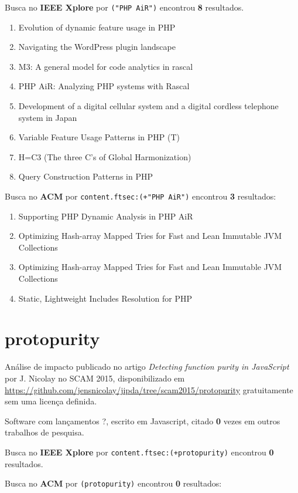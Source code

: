 Busca no {\bf IEEE Xplore} por
\texttt{("PHP AiR")}
encontrou {\bf 8}
resultados.

\begin{enumerate}
\item Evolution of dynamic feature usage in PHP
\item Navigating the WordPress plugin landscape
\item M3: A general model for code analytics in rascal
\item PHP AiR: Analyzing PHP systems with Rascal
\item Development of a digital cellular system and a digital cordless telephone system in Japan
\item Variable Feature Usage Patterns in PHP (T)
\item H=C3 (The three C's of Global Harmonization)
\item Query Construction Patterns in PHP
\end{enumerate}

Busca no {\bf ACM} por
\texttt{content.ftsec:(+"PHP AiR")}
encontrou {\bf 3}
resultados:

\begin{enumerate}
\item Supporting PHP Dynamic Analysis in PHP AiR
\item Optimizing Hash-array Mapped Tries for Fast and Lean Immutable JVM Collections
\item Optimizing Hash-array Mapped Tries for Fast and Lean Immutable JVM Collections
\item Static, Lightweight Includes Resolution for PHP
\end{enumerate}

\section{protopurity}

Análise de impacto
publicado no artigo {\it Detecting function purity in JavaScript}
por J. Nicolay
no SCAM 2015,
disponibilizado em \url{https://github.com/jensnicolay/jipda/tree/scam2015/protopurity}
gratuitamente
sem uma licença definida.

Software com lançamentos ?,
escrito em Javascript,
citado {\bf 0} vezes em outros trabalhos de pesquisa.

Busca no {\bf IEEE Xplore} por
\texttt{content.ftsec:(+protopurity)}
encontrou {\bf 0}
resultados.


Busca no {\bf ACM} por
\texttt{(protopurity)}
encontrou {\bf 0}
resultados:


